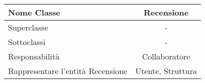 
\setcounter{table}{0}
\begin{table}[H]
    \centering
    \begin{tabular}{||   l  ||  c   ||}
        \rowcolor{Gray}
        \hline
        Nome Classe & Recensione\\
        \hline
        Superclasse  &  - \\
        \hline
        Sottoclassi & - \\
        \hline
        \hline
         Responsabilità & Collaboratore \\
         \hline
          Rappresentare l'entità Recensione & Utente, Struttura \\
         \hline
    \end{tabular}
\end{table}

    
       
